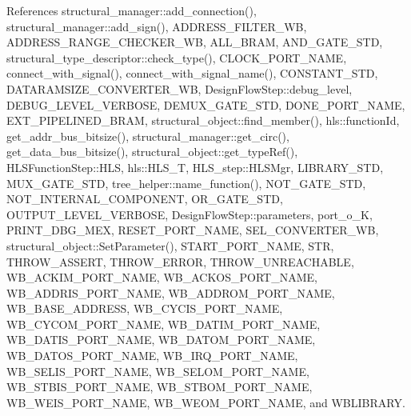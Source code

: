 References structural\+\_\+manager\+::add\+\_\+connection(), structural\+\_\+manager\+::add\+\_\+sign(), A\+D\+D\+R\+E\+S\+S\+\_\+\+F\+I\+L\+T\+E\+R\+\_\+\+WB, A\+D\+D\+R\+E\+S\+S\+\_\+\+R\+A\+N\+G\+E\+\_\+\+C\+H\+E\+C\+K\+E\+R\+\_\+\+WB, A\+L\+L\+\_\+\+B\+R\+AM, A\+N\+D\+\_\+\+G\+A\+T\+E\+\_\+\+S\+TD, structural\+\_\+type\+\_\+descriptor\+::check\+\_\+type(), C\+L\+O\+C\+K\+\_\+\+P\+O\+R\+T\+\_\+\+N\+A\+ME, connect\+\_\+with\+\_\+signal(), connect\+\_\+with\+\_\+signal\+\_\+name(), C\+O\+N\+S\+T\+A\+N\+T\+\_\+\+S\+TD, D\+A\+T\+A\+R\+A\+M\+S\+I\+Z\+E\+\_\+\+C\+O\+N\+V\+E\+R\+T\+E\+R\+\_\+\+WB, Design\+Flow\+Step\+::debug\+\_\+level, D\+E\+B\+U\+G\+\_\+\+L\+E\+V\+E\+L\+\_\+\+V\+E\+R\+B\+O\+SE, D\+E\+M\+U\+X\+\_\+\+G\+A\+T\+E\+\_\+\+S\+TD, D\+O\+N\+E\+\_\+\+P\+O\+R\+T\+\_\+\+N\+A\+ME, E\+X\+T\+\_\+\+P\+I\+P\+E\+L\+I\+N\+E\+D\+\_\+\+B\+R\+AM, structural\+\_\+object\+::find\+\_\+member(), hls\+::function\+Id, get\+\_\+addr\+\_\+bus\+\_\+bitsize(), structural\+\_\+manager\+::get\+\_\+circ(), get\+\_\+data\+\_\+bus\+\_\+bitsize(), structural\+\_\+object\+::get\+\_\+type\+Ref(), H\+L\+S\+Function\+Step\+::\+H\+LS, hls\+::\+H\+L\+S\+\_\+T, H\+L\+S\+\_\+step\+::\+H\+L\+S\+Mgr, L\+I\+B\+R\+A\+R\+Y\+\_\+\+S\+TD, M\+U\+X\+\_\+\+G\+A\+T\+E\+\_\+\+S\+TD, tree\+\_\+helper\+::name\+\_\+function(), N\+O\+T\+\_\+\+G\+A\+T\+E\+\_\+\+S\+TD, N\+O\+T\+\_\+\+I\+N\+T\+E\+R\+N\+A\+L\+\_\+\+C\+O\+M\+P\+O\+N\+E\+NT, O\+R\+\_\+\+G\+A\+T\+E\+\_\+\+S\+TD, O\+U\+T\+P\+U\+T\+\_\+\+L\+E\+V\+E\+L\+\_\+\+V\+E\+R\+B\+O\+SE, Design\+Flow\+Step\+::parameters, port\+\_\+o\+\_\+K, P\+R\+I\+N\+T\+\_\+\+D\+B\+G\+\_\+\+M\+EX, R\+E\+S\+E\+T\+\_\+\+P\+O\+R\+T\+\_\+\+N\+A\+ME, S\+E\+L\+\_\+\+C\+O\+N\+V\+E\+R\+T\+E\+R\+\_\+\+WB, structural\+\_\+object\+::\+Set\+Parameter(), S\+T\+A\+R\+T\+\_\+\+P\+O\+R\+T\+\_\+\+N\+A\+ME, S\+TR, T\+H\+R\+O\+W\+\_\+\+A\+S\+S\+E\+RT, T\+H\+R\+O\+W\+\_\+\+E\+R\+R\+OR, T\+H\+R\+O\+W\+\_\+\+U\+N\+R\+E\+A\+C\+H\+A\+B\+LE, W\+B\+\_\+\+A\+C\+K\+I\+M\+\_\+\+P\+O\+R\+T\+\_\+\+N\+A\+ME, W\+B\+\_\+\+A\+C\+K\+O\+S\+\_\+\+P\+O\+R\+T\+\_\+\+N\+A\+ME, W\+B\+\_\+\+A\+D\+D\+R\+I\+S\+\_\+\+P\+O\+R\+T\+\_\+\+N\+A\+ME, W\+B\+\_\+\+A\+D\+D\+R\+O\+M\+\_\+\+P\+O\+R\+T\+\_\+\+N\+A\+ME, W\+B\+\_\+\+B\+A\+S\+E\+\_\+\+A\+D\+D\+R\+E\+SS, W\+B\+\_\+\+C\+Y\+C\+I\+S\+\_\+\+P\+O\+R\+T\+\_\+\+N\+A\+ME, W\+B\+\_\+\+C\+Y\+C\+O\+M\+\_\+\+P\+O\+R\+T\+\_\+\+N\+A\+ME, W\+B\+\_\+\+D\+A\+T\+I\+M\+\_\+\+P\+O\+R\+T\+\_\+\+N\+A\+ME, W\+B\+\_\+\+D\+A\+T\+I\+S\+\_\+\+P\+O\+R\+T\+\_\+\+N\+A\+ME, W\+B\+\_\+\+D\+A\+T\+O\+M\+\_\+\+P\+O\+R\+T\+\_\+\+N\+A\+ME, W\+B\+\_\+\+D\+A\+T\+O\+S\+\_\+\+P\+O\+R\+T\+\_\+\+N\+A\+ME, W\+B\+\_\+\+I\+R\+Q\+\_\+\+P\+O\+R\+T\+\_\+\+N\+A\+ME, W\+B\+\_\+\+S\+E\+L\+I\+S\+\_\+\+P\+O\+R\+T\+\_\+\+N\+A\+ME, W\+B\+\_\+\+S\+E\+L\+O\+M\+\_\+\+P\+O\+R\+T\+\_\+\+N\+A\+ME, W\+B\+\_\+\+S\+T\+B\+I\+S\+\_\+\+P\+O\+R\+T\+\_\+\+N\+A\+ME, W\+B\+\_\+\+S\+T\+B\+O\+M\+\_\+\+P\+O\+R\+T\+\_\+\+N\+A\+ME, W\+B\+\_\+\+W\+E\+I\+S\+\_\+\+P\+O\+R\+T\+\_\+\+N\+A\+ME, W\+B\+\_\+\+W\+E\+O\+M\+\_\+\+P\+O\+R\+T\+\_\+\+N\+A\+ME, and W\+B\+L\+I\+B\+R\+A\+RY.



